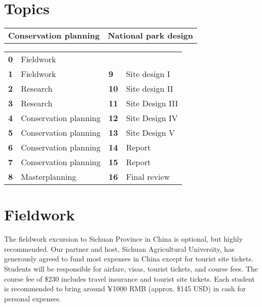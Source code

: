 \documentclass[11pt,article,oneside]{memoir}
\begin{document}
\section{Topics}
%
\begin{table}[H]
\begin{tabular}{l @{\hskip 2.5cm} l}
\textbf{Conservation planning} & \textbf{National park design}\\
\end{tabular}
\end{table}
%
\vspace*{-1em}
%
\begin{table}[H]
\begin{tabular}{l l @{\hskip 2cm} l l}
\small
\textbf{0} & Fieldwork \\
\textbf{1} & Fieldwork & \textbf{9} & Site design  I\\
\textbf{2} & Research & \textbf{10} & Site design II\\
\textbf{3} & Research & \textbf{11} & Site Design III\\
\textbf{4} & Conservation planning & \textbf{12} & Site Design IV\\
\textbf{5} & Conservation planning & \textbf{13} & Site Design V\\
\textbf{6} & Conservation planning & \textbf{14} & Report\\
\textbf{7} & Conservation planning & \textbf{15} & Report\\
\textbf{8} & Masterplanning & \textbf{16} & Final review\\
\end{tabular}
\end{table}
%

\section{Fieldwork}

The fieldwork excursion to Sichuan Province in China 
is optional, but highly recommended. 
Our partner and host, Sichuan Agricultural University, 
has generously agreed to fund most expenses in China 
except for tourist site tickets. 
Students will be responsible for airfare, visas, 
tourist tickets, and course fees. 
The course fee of \$230 includes 
travel insurance and tourist site tickets.  
Each student is recommended to bring around 
¥1000 RMB (approx. \$145 USD) in cash for personal expenses. 
\end{document}
